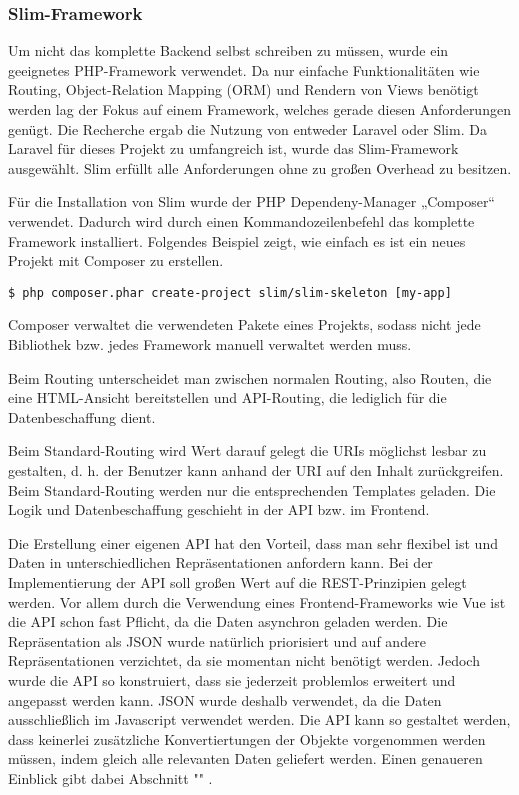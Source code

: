\subsubsection{Slim-Framework}  
\label{sec:Slim-Framework-1}

Um nicht das komplette Backend selbst schreiben zu müssen, wurde ein geeignetes PHP-Framework verwendet. Da nur einfache Funktionalitäten wie Routing, Object-Relation Mapping (ORM) und Rendern von Views benötigt werden lag der Fokus auf einem Framework, welches gerade diesen Anforderungen genügt. Die Recherche ergab die Nutzung von entweder Laravel oder Slim. Da Laravel für dieses Projekt zu umfangreich ist, wurde das Slim-Framework ausgewählt. Slim erfüllt alle Anforderungen ohne zu großen Overhead zu besitzen. 

Für die Installation von Slim wurde der PHP Dependeny-Manager „Composer“ verwendet. Dadurch wird durch einen Kommandozeilenbefehl das komplette Framework installiert.
Folgendes Beispiel zeigt, wie einfach es ist ein neues Projekt mit Composer zu erstellen.
 
\begin{lstlisting}[frame=single] 
$ php composer.phar create-project slim/slim-skeleton [my-app]
\end{lstlisting}

Composer verwaltet die verwendeten Pakete eines Projekts, sodass nicht jede Bibliothek bzw. jedes Framework manuell verwaltet werden muss.	

Beim Routing unterscheidet man zwischen normalen Routing, also Routen, die eine HTML-Ansicht bereitstellen und API-Routing, die lediglich für die Datenbeschaffung dient. 

Beim Standard-Routing wird Wert darauf gelegt die URIs möglichst lesbar zu gestalten, d. h. der Benutzer kann anhand der URI auf den Inhalt zurückgreifen. 
Beim Standard-Routing werden nur die entsprechenden Templates geladen. Die Logik und Datenbeschaffung geschieht in der API bzw. im Frontend.

Die Erstellung einer eigenen API hat den Vorteil, dass man sehr flexibel ist und Daten in unterschiedlichen Repräsentationen anfordern kann. Bei der Implementierung der API soll großen Wert auf die REST-Prinzipien gelegt werden. 
Vor allem durch die Verwendung eines Frontend-Frameworks wie Vue ist die API schon fast Pflicht, da die Daten asynchron geladen werden.
Die Repräsentation als JSON wurde natürlich priorisiert und auf andere Repräsentationen verzichtet, da sie momentan nicht benötigt werden. Jedoch wurde die API so konstruiert, dass sie jederzeit problemlos erweitert und angepasst werden kann. JSON wurde deshalb verwendet, da die Daten ausschließlich im Javascript verwendet werden. Die API kann so gestaltet werden, dass keinerlei zusätzliche Konvertiertungen der Objekte vorgenommen werden müssen, indem gleich alle relevanten Daten geliefert werden.
Einen genaueren Einblick gibt dabei Abschnitt "" .

